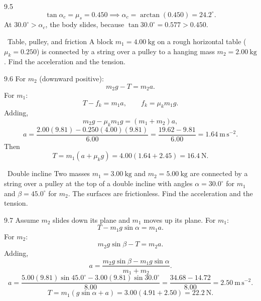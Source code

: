 \begin{tabletworkspace}[6.5cm]
\end{tabletworkspace}

\begin{solution}{9.5}
\[
\tan\alpha_c=\mu_s=0.450
\implies
\alpha_c=\arctan(0.450)=24.2^\circ.
\]
At $30.0^\circ>\alpha_c$, the body slides, because
$\tan30.0^\circ=0.577>0.450$.
\end{solution}

\begin{exercise}{\core\ Table, pulley, and friction}
A block $m_1=4.00\ \mathrm{kg}$ on a rough horizontal table
($\mu_k=0.250$) is connected by a string over a pulley to a hanging mass
$m_2=2.00\ \mathrm{kg}$. Find the acceleration and the tension.
\end{exercise}

\begin{tabletworkspace}[6.5cm]
\end{tabletworkspace}

\begin{solution}{9.6}
For $m_2$ (downward positive):
\[
m_2g-T=m_2a.
\]
For $m_1$:
\[
T-f_k=m_1a,\qquad f_k=\mu_km_1g.
\]
Adding,
\[
m_2g-\mu_km_1g=(m_1+m_2)a,
\]
\[
a=\frac{2.00(9.81)-0.250(4.00)(9.81)}{6.00}
=\frac{19.62-9.81}{6.00}=1.64\ \mathrm{m\,s^{-2}}.
\]
Then
\[
T=m_1(a+\mu_kg)=4.00(1.64+2.45)=16.4\ \mathrm{N}.
\]
\end{solution}

\begin{exercise}{\core\ Double incline}
Two masses $m_1=3.00\ \mathrm{kg}$ and $m_2=5.00\ \mathrm{kg}$ are connected by
a string over a pulley at the top of a double incline with angles
$\alpha=30.0^\circ$ for $m_1$ and $\beta=45.0^\circ$ for $m_2$. The surfaces are
frictionless. Find the acceleration and the tension.
\end{exercise}

\begin{tabletworkspace}[6.5cm]
\end{tabletworkspace}

\begin{solution}{9.7}
Assume $m_2$ slides down its plane and $m_1$ moves up its plane. For $m_1$:
\[
T-m_1g\sin\alpha=m_1a.
\]
For $m_2$:
\[
m_2g\sin\beta-T=m_2a.
\]
Adding,
\[
a=\frac{m_2g\sin\beta-m_1g\sin\alpha}{m_1+m_2}.
\]
\[
a=\frac{5.00(9.81)\sin45.0^\circ-3.00(9.81)\sin30.0^\circ}{8.00}
=\frac{34.68-14.72}{8.00}=2.50\ \mathrm{m\,s^{-2}}.
\]
\[
T=m_1(g\sin\alpha+a)=3.00(4.91+2.50)=22.2\ \mathrm{N}.
\]
\end{solution}

